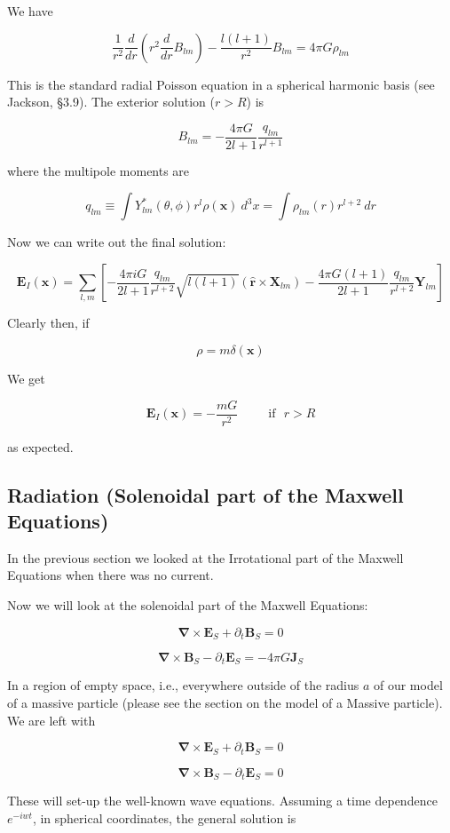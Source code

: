 \documentclass {article}
\renewcommand\vec{\mathbf}
\let\OldS\nabla
\renewcommand{\nabla}{\boldsymbol{\OldS}}
\let\OldHat\hat
\renewcommand{\hat}[1]{\OldHat{\mathbf{#1}}}
\begin{document}
We have

$$\frac 1 {r^2} \frac d {dr} \left( r^2 \frac d {dr} B_{lm} \right) - \frac {l(l+1)} {r^2} B_{lm} = 4 \pi G \rho_{lm}$$


This is the standard radial Poisson equation in a spherical harmonic basis (see Jackson, \S 3.9). The exterior solution ($r > R$) is


$$ B_{lm} = - \frac {4 \pi G }{2l + 1} \frac {q_{lm}}{r^{l+1}} $$ 

where the multipole moments are

$$q_{lm} \equiv \int Y_{lm}^* (\theta, \phi) r^l  \rho (\vec x) ~ d^3x = \int \rho_{lm} (r) r^{l+2} ~ dr $$


Now we can write out the final solution:

$$\vec E_I(\vec x) = \sum_{l,m} \left[ -\frac {4\pi i G }{2l+1} \frac {q_{lm}}{r^{l+2}} \sqrt {l(l+1)} \left(\hat r \times \vec X_{lm} \right)  - \frac {4 \pi G (l+1)}{2l+1} \frac {q_{lm}}{r^{l+2}} \vec Y_{lm} \right] $$


Clearly then, if

$$\rho = m\delta(\vec x) $$

We get

$$\vec E_I(\vec x) = - \frac {mG} {r^2}  ~~~~~~~~~~~ \textrm{if} ~~~ r > R$$

as expected.
\newpage
\subsection{Radiation (Solenoidal part of the Maxwell Equations)}

In the previous section we looked at the Irrotational part of the Maxwell Equations when there was no current.

Now we will look at the solenoidal part of the Maxwell Equations:

$$\nabla \times \vec E_S + \partial_t \vec B_S = 0 $$

$$\nabla \times \vec B_S - \partial_t \vec E_S =  - 4 \pi G \vec J_S$$

In a region of empty space, i.e., everywhere outside of the radius $a$ of our model of a massive particle (please see the section on the model of a Massive particle). We are left with 

$$\nabla \times \vec E_S + \partial_t \vec B_S = 0 $$

$$\nabla \times \vec B_S - \partial_t \vec E_S =  0$$

These will set-up the well-known wave equations. Assuming a time dependence $e^{-iwt}$, in spherical coordinates, the general solution is
\end{document}
